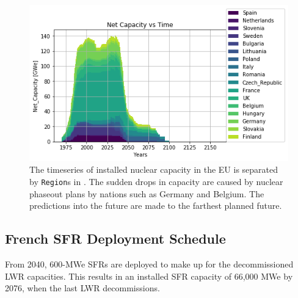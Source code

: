 \begin{figure}[htbp!]
    \begin{center}
        \includegraphics[scale=0.7]{./images/eu_future/power_plot.png}
    \end{center}
    \caption{The timeseries of installed nuclear capacity in the EU is separated by \texttt{Region}s in \Cyclus.
             The sudden drops in capacity are caused by nuclear phaseout plans by nations such as Germany and Belgium.
             The predictions into the future are made to the farthest planned future.
             }
    \label{fig:eu_pow}
\end{figure}



\subsection{French \gls{SFR} Deployment Schedule}

From 2040,
600-\gls{MWe} \glspl{SFR} are deployed to make up for the 
decommissioned \gls{LWR} capacities. 
This results in an installed \gls{SFR} capacity of 66,000 \gls{MWe}
 by 2076, when the last \gls{LWR} decommissions.

